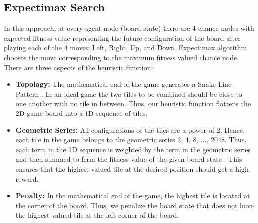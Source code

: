 \documentclass{svproc}
\begin{document}



\subsection{Expectimax Search}
   	
   In this approach, at every agent node (board state) there are 4 chance nodes with expected fitness value representing the future configuration of the board after playing each of the 4 moves: Left, Right, Up, and Down. Expectimax algorithm chooses the move corresponding to the maximum fitness valued chance node. There are three aspects of the heuristic function:

\begin{itemize}
    \item \textbf{Topology:} The mathematical end of the game generates a Snake-Line Pattern \cite{blog_maths_2048}. In an ideal game the two tiles to be combined should be close to one another with no tile in between. Thus, our heuristic function flattens the 2D game board into a 1D sequence of tiles.
    
    \item \textbf{Geometric Series:} All configurations of the tiles are a power of 2. Hence, each tile in the game belongs to the geometric series 2, 4, 8, ..., 2048. Thus, each term in the 1D sequence is weighted by the term in the geometric series and then summed to form the fitness value of the given board state \cite{blog_optimum_2048,blog_maths_2048,gjdanis}. This ensures that the highest valued tile at the desired position should get a high reward.
    
    \item \textbf{Penalty:} In the mathematical end of the game, the highest tile is located at the corner of the board. Thus, we penalize the board state that does not have the highest valued tile at the left corner of the board.
    

    
\end{itemize}
\end{document}
